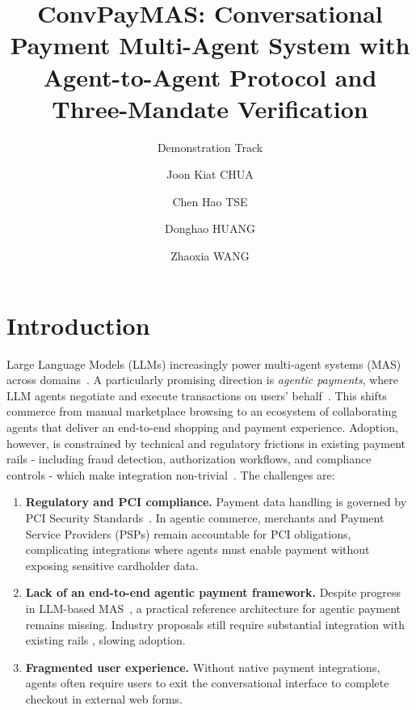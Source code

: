 \documentclass[sigconf]{aamas}
\title{ConvPayMAS: Conversational Payment Multi-Agent System with Agent-to-Agent Protocol and Three-Mandate Verification}
\subtitle{Demonstration Track}
\author{Joon Kiat CHUA}
\affiliation{
\institution{Singapore Management University}
\city{Singapore}
\country{Singapore}}
\author{Chen Hao TSE}
\affiliation{
\institution{Mastercard}
\city{Singapore}
\country{Singapore}}
\author{Donghao HUANG}
\affiliation{
\institution{Mastercard}
\city{Arlington, Virginia}
\country{United States}}
\author{Zhaoxia WANG}
\affiliation{
\institution{Singapore Management University}
\city{Singapore}
\country{Singapore}}
\begin{document}

\pagestyle{fancy}
\fancyhead{}


\maketitle 

\section{Introduction}

Large Language Models (LLMs) increasingly power multi-agent systems (MAS) across domains~\cite{guo2024mascollab,tran2025mascollab,plaat2025agentic}. A particularly promising direction is \emph{agentic payments}, where LLM agents negotiate and execute transactions on users’ behalf~\cite{mckinsey2025agenticpayments, mastercard2025agentcommerce, visa2025commerce}. This shifts commerce from manual marketplace browsing to an ecosystem of collaborating agents that deliver an end-to-end shopping and payment experience. Adoption, however, is constrained by technical and regulatory frictions in existing payment rails - including fraud detection, authorization workflows, and compliance controls - which make integration non-trivial~\cite{dwight2025payments, mckinsey2025agenticpayments}. The challenges are:

\begin{enumerate}
    \item \textbf{Regulatory and PCI compliance.} Payment data handling is governed by PCI Security Standards~\cite{pcisecurity2025ai,pci2025standards}. In agentic commerce, merchants and Payment Service Providers (PSPs) remain accountable for PCI obligations, complicating integrations where agents must enable payment without exposing sensitive cardholder data.
    \item \textbf{Lack of an end-to-end agentic payment framework.} Despite progress in LLM-based MAS~\cite{guo2024mascollab,plaat2025agentic,tran2025mascollab}, a practical reference architecture for agentic payment remains missing. Industry proposals still require substantial integration with existing rails \cite{mastercard2025agentcommerce, visa2025commerce}, slowing adoption.
    \item \textbf{Fragmented user experience.} Without native payment integrations, agents often require users to exit the conversational interface to complete checkout in external web forms.
\end{enumerate}
\end{document}
